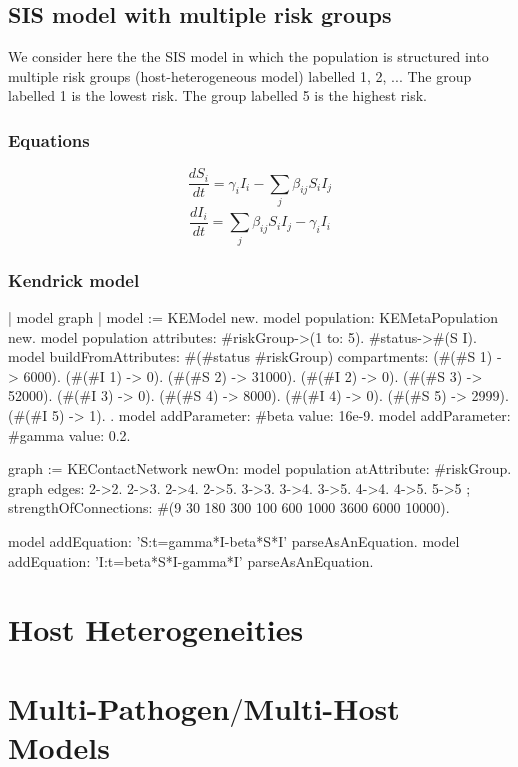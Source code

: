 \documentclass[a4paper,10pt,twoside]{book}
\begin{document}
\section{ SIS model with multiple risk groups}
We consider here the the SIS model in which the population is structured into multiple risk groups (host-heterogeneous model) labelled 1, 2, ...
The group labelled 1 is the lowest risk. The group labelled 5 is the highest risk.
\subsection{ Equations}

  \begin{equation}
    \frac{dS_i}{dt} = \gamma_i I_i - \sum_j \beta_{ij} S_i I_j
  \end{equation}
  \begin{equation}
    \frac{dI_i}{dt} = \sum_j \beta_{ij} S_i I_j - \gamma_i I_i
  \end{equation}
  
\subsection{ Kendrick model}

\begin{code}{}
| model graph |
	model := KEModel new.
	model population: KEMetaPopulation new.
	model population attributes: {#riskGroup->(1 to: 5). #status->#(S I)}.
	model
		buildFromAttributes: #(#status #riskGroup)
		compartments: {
		  (#(#S 1) -> 6000). (#(#I 1) -> 0).
        (#(#S 2) -> 31000). (#(#I 2) -> 0).
        (#(#S 3) -> 52000). (#(#I 3) -> 0).
        (#(#S 4) -> 8000). (#(#I 4) -> 0).
        (#(#S 5) -> 2999). (#(#I 5) -> 1).
		}.
	model addParameter: #beta value: 16e-9.
	model addParameter: #gamma value: 0.2.

	graph := KEContactNetwork
					newOn: model population
					atAttribute: #riskGroup.
	graph edges: { 2->2. 2->3. 2->4. 2->5. 3->3. 3->4. 3->5. 4->4. 4->5. 5->5 };
			strengthOfConnections: #(9 30 180 300 100 600 1000 3600 6000 10000).

	model addEquation: 'S:t=gamma*I-beta*S*I' parseAsAnEquation.
	model addEquation: 'I:t=beta*S*I-gamma*I' parseAsAnEquation.
\end{code}

\chapter{ Host Heterogeneities}\chapter{ Multi-Pathogen$/$Multi-Host Models}




\printindex
\end{document}
